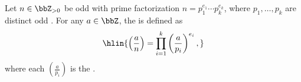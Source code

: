 \begin{definition} \label{definition:jacobi_symbol}
    Let $n \in \bbZ_{>0}$ be odd with prime factorization $n = p_1^{e_1} \cdots p_k^{e_k}$, where $p_1, \dots, p_k$ are distinct odd . For any $a \in \bbZ$, the  is defined as
    $$\hlin{\left(\frac{a}{n}\right) = \prod_{i=1}^k \left(\frac{a}{p_i}\right)^{e_i},}$$
    where each $\left(\frac{a}{p_i}\right)$ is the .
\end{definition}
